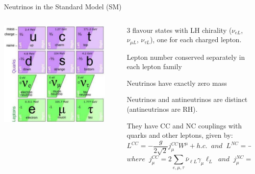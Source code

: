 %
%
%

\begin{frame}{Neutrinos in the Standard Model (SM)}

  \begin{columns}
    \begin{column}{0.30\textwidth}
      \includegraphics[width=0.90\textwidth]{./images/intro/quarks_and_leptons}
    \end{column}
    \begin{column}{0.70\textwidth}
       \begin{itemize}
         {\scriptsize
         \item 3 flavour states with LH chirality ($\nu_{eL}$, $\nu_{{\mu}L}$, $\nu_{{\tau}L}$),
               one for each charged lepton.
         \item Lepton number conserved separately in each lepton family
         \item Neutrinos have exactly zero mass
         \item Neutrinos and antineutrinos are distinct (antineutrinos are RH).
         \item They have CC and NC couplings with quarks and other leptons, given by:
         \begin{equation*}
           L^{CC} = -\frac{g}{2\sqrt{2}} j_{\mu}^{CC} W^{\mu} + h.c.
           \;\;and\;\;
           L^{NC} = -\frac{g}{2cos\theta_{w}} j_{\mu}^{NC} Z^{\mu}
         \end{equation*}
         \begin{equation*}
           where \;\;
           j_{\mu}^{CC} = 2 \sum_{e,\mu, \tau} \bar{\nu}_{{\ell}L} \gamma_{\mu} \ell_{L}
           \;\;and\;\;
           j_{\mu}^{NC} = \sum_{e,\mu, \tau} \bar{\nu}_{{\ell}L} \gamma_{\mu} \nu_{{\ell}L}
         \end{equation*}
         }
       \end{itemize}
    \end{column}
  \end{columns}


\end{frame}
